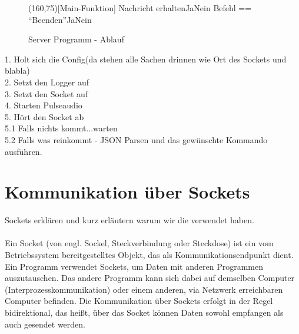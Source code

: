 \begin{figure}[H]
    \begin{struktogramm}(160,75)[Main-Funktion] 
        	 {Nachricht erhalten}{Ja}{Nein}
        	     {Befehl == \enquote{Beenden}}{Ja}{Nein}
        	    	\change
        	    \ifend
        		\change
        	\ifend
        \whileend
    \end{struktogramm} 
\caption{Server Programm - Ablauf} 
\label{lst:server_ablauf} 
\end{figure}

1. Holt sich die Config(da stehen alle Sachen drinnen wie Ort des Sockets und blabla)\\
2. Setzt den Logger auf \\
3. Setzt den Socket auf \\
4. Starten Pulseaudio \\
5. Hört den Socket ab \\
	5.1 Falls nichts kommt...warten \\
	5.2 Falls was reinkommt - JSON Parsen und das gewünschte Kommando ausführen.\\
	

\section{Kommunikation über Sockets}
Sockets erklären und kurz erläutern warum wir die verwendet haben.\\
\\
Ein Socket (von engl. Sockel, Steckverbindung oder Steckdose) ist ein vom Betriebssystem bereitgestelltes Objekt, das als Kommunikationsendpunkt dient. Ein Programm verwendet Sockets, um Daten mit anderen Programmen auszutauschen. Das andere Programm kann sich dabei auf demselben Computer (Interprozesskommunikation) oder einem anderen, via Netzwerk erreichbaren Computer befinden. Die Kommunikation über Sockets erfolgt in der Regel bidirektional, das heißt, über das Socket können Daten sowohl empfangen als auch gesendet werden.

